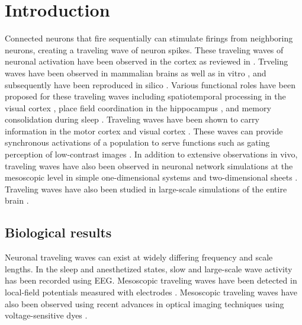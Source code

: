 
\chapter{Introduction}
Connected neurons that fire sequentially can stimulate firings from neighboring neurons, creating a traveling wave of neuron spikes. 
These traveling waves of neuronal activation have been observed in the cortex as reviewed in \citet{Muller2018}.
Trveling waves have been observed in mammalian brains \citep{Golomb1997}\citep{reimer2010}\citep{Sato2012}  as well as in vitro \citep{wu2008}\citep{huang2004}\citep{Golomb1999}, and subsequently have been reproduced in silico \citep{keane2015}\citep{Senk2020}\citep{Golomb1996}\citep{ermentrout2001}. 
Various functional roles have been proposed for these traveling waves including spatiotemporal processing in the visual cortex \citep{Chemla2019}\citep{Muller2014}, place field coordination in the hippocampus \citep{lubernov2009}, and memory consolidation during sleep \citep{Dickey2021}.
Traveling waves have been shown to carry information in the  motor cortex \citep{Rubino2006} and visual cortex \citep{Besserve2015}.
These waves can provide synchronous activations of a population to serve functions such as gating perception of low-contrast images \citep{Davis2020}.
In addition to extensive observations in vivo, traveling waves have also been observed in neuronal network simulations at the mesoscopic level in simple one-dimensional systems \citep{Wilson1973}\citep{Golomb1999} and two-dimensional sheets \citep{keane2015}\citep{Pyle2017}\citep{Townsend2018}.
Traveling waves have also been studied in large-scale simulations of the entire brain \citep{Roberts2019}.


\section{Biological results}
Neuronal traveling waves can exist at widely differing frequency and scale lengths.  
In the sleep and anesthetized states, slow and large-scale wave activity has been recorded using EEG\citep{Muller2018}. 
Mesoscopic traveling waves have been detected in local-field potentials measured with electrodes \citep{Rubino2006}\citep{sanes1993}\citep{Riehle2013}.
Mesoscopic traveling waves have also been observed using recent advances in optical imaging techniques using voltage-sensitive dyes \citep{wu2008}\citep{Shoham1999}\citep{Xu2007}\citep{Ferezou2006}.  

